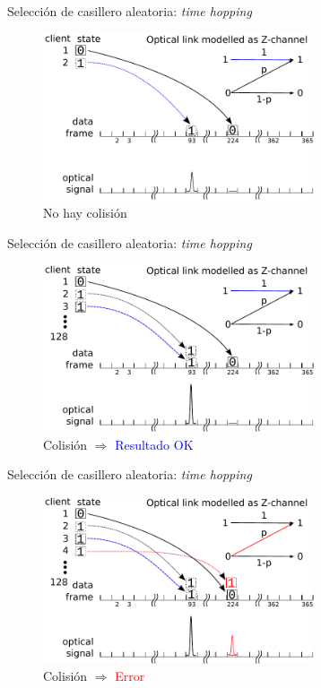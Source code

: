 \documentclass[aspectratio=169]{beamer}
\begin{document}
\begin{frame}{Selección de casillero aleatoria: \textit{time hopping}}
\begin{figure}[t]
  \centering
    \includegraphics[width=8cm]{graphs/slide2.pdf}
    \\ \huge No hay colisión
\end{figure}
\end{frame}
\begin{frame}{Selección de casillero aleatoria: \textit{time hopping}}
\begin{figure}[t]
  \centering
    \includegraphics[width=8cm]{graphs/slide3.pdf}
    \\ \huge Colisión $\Rightarrow$ \textcolor{blue}{Resultado OK}
\end{figure}
\end{frame}
\begin{frame}{Selección de casillero aleatoria: \textit{time hopping}}
\begin{figure}[t]
  \centering
    \includegraphics[width=8cm]{graphs/slide4.pdf}
    \\ \huge Colisión $\Rightarrow$ \textcolor{red}{Error}
\end{figure}
\end{frame}
\end{document}
